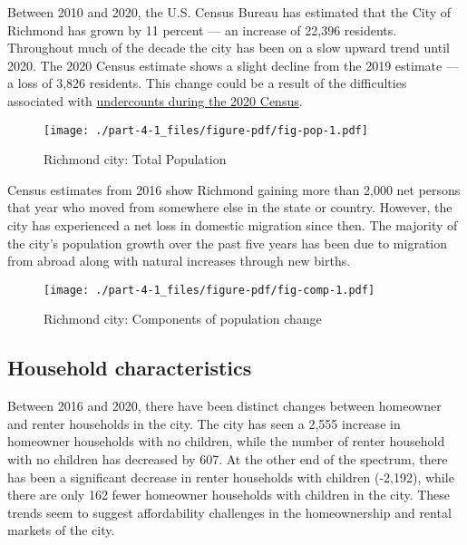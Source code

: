 \documentclass[
  letterpaper,
  DIV=11,
  numbers=noendperiod]{scrreprt}
\begin{document}
Between 2010 and 2020, the U.S. Census Bureau has estimated that the
City of Richmond has grown by 11 percent --- an increase of 22,396
residents. Throughout much of the decade the city has been on a slow
upward trend until 2020. The 2020 Census estimate shows a slight decline
from the 2019 estimate --- a loss of 3,826 residents. This change could
be a result of the difficulties associated with
\href{https://censuscounts.org/whats-at-stake/will-you-count-renters-in-the-2020-census/}{undercounts
during the 2020 Census}.

\begin{figure}

{\centering \texttt{[image: ./part-4-1\_files/figure-pdf/fig-pop-1.pdf]}

}

\caption{\label{fig-pop}Richmond city: Total Population}

\end{figure}

Census estimates from 2016 show Richmond gaining more than 2,000 net
persons that year who moved from somewhere else in the state or country.
However, the city has experienced a net loss in domestic migration since
then. The majority of the city's population growth over the past five
years has been due to migration from abroad along with natural increases
through new births.

\begin{figure}

{\centering \texttt{[image: ./part-4-1\_files/figure-pdf/fig-comp-1.pdf]}

}

\caption{\label{fig-comp}Richmond city: Components of population change}

\end{figure}

\hypertarget{household-characteristics}{%
\subsection{Household characteristics}\label{household-characteristics}}

Between 2016 and 2020, there have been distinct changes between
homeowner and renter households in the city. The city has seen a 2,555
increase in homeowner households with no children, while the number of
renter household with no children has decreased by 607. At the other end
of the spectrum, there has been a significant decrease in renter
households with children (-2,192), while there are only 162 fewer
homeowner households with children in the city. These trends seem to
suggest affordability challenges in the homeownership and rental markets
of the city.
\end{document}
